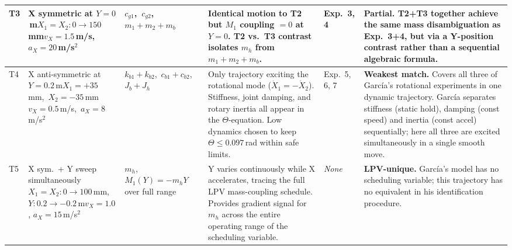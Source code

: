 \documentclass[a4paper, 11pt]{article}
\begin{document}
\begin{table}[htbp]
\begin{tabular}{C{0.5cm} L{2.8cm} L{3.0cm} L{3.0cm} C{1.1cm} L{3.5cm}}
\midrule

T3 &
X symmetric at $Y=0$\,m\newline $X_1{=}X_2: 0\to150$\,mm\newline $v_X=1.5$\,m/s,\ $a_X=20$\,m/s$^2$ &
$c_{g1}$,\ $c_{g2}$,\ $m_1{+}m_2{+}m_b$ &
Identical motion to T2 but $M_1$ coupling $= 0$ at $Y=0$.
T2 vs.\ T3 contrast isolates $m_h$ from $m_1{+}m_2{+}m_b$. &
Exp.~3, 4 &
\textbf{Partial.} T2+T3 together achieve the same mass disambiguation as
Exp.~3+4, but via a Y-position contrast rather than a sequential algebraic formula. \\

\midrule

T4 &
X anti-symmetric at $Y=0.2$\,m\newline $X_1{=}+35$\,mm,\ $X_2{=}-35$\,mm\newline $v_X=0.5$\,m/s,\ $a_X=8$\,m/s$^2$ &
$k_{b1}{+}k_{b2}$,\ $c_{b1}{+}c_{b2}$,\ $J_b{+}J_h$ &
Only trajectory exciting the rotational mode ($\dot{X}_1=-\dot{X}_2$).
Stiffness, joint damping, and rotary inertia all appear in the $\Theta$-equation.
Low dynamics chosen to keep $\Theta \leq 0.097$\,rad within safe limits. &
Exp.~5, 6, 7 &
\textbf{Weakest match.} Covers all three of Garc\'{i}a's rotational experiments
in one dynamic trajectory. Garc\'{i}a separates stiffness (static hold),
damping (const speed) and inertia (const accel) sequentially;
here all three are excited simultaneously in a single smooth move. \\

\midrule

T5 &
X sym.\ + Y sweep simultaneously\newline $X_1{=}X_2: 0\to100$\,mm,\newline $Y: 0.2\to-0.2$\,m\newline $v_X=1.0$, $a_X=15$\,m/s$^2$ &
$m_h$,\ $M_1(Y) = -m_h Y$ over full range &
Y varies continuously while X accelerates, tracing the full LPV mass-coupling
schedule. Provides gradient signal for $m_h$ across the entire operating range
of the scheduling variable. &
\emph{None} &
\textbf{LPV-unique.} Garc\'{i}a's model has no scheduling variable; this trajectory
has no equivalent in his identification procedure. \\

\bottomrule
\end{tabular}
\end{table}
\end{document}
